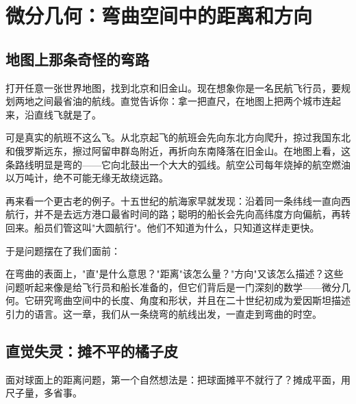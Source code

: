 \chapter{微分几何：弯曲空间中的距离和方向}

\section{地图上那条奇怪的弯路}

打开任意一张世界地图，找到北京和旧金山。现在想象你是一名民航飞行员，要规划两地之间最省油的航线。直觉告诉你：拿一把直尺，在地图上把两个城市连起来，沿直线飞就是了。

可是真实的航班不这么飞。从北京起飞的航班会先向东北方向爬升，掠过我国东北和俄罗斯远东，擦过阿留申群岛附近，再折向东南降落在旧金山。在地图上看，这条路线明显是弯的——它向北鼓出一个大大的弧线。航空公司每年烧掉的航空燃油以万吨计，绝不可能无缘无故绕远路。

再来看一个更古老的例子。十五世纪的航海家早就发现：沿着同一条纬线一直向西航行，并不是去远方港口最省时间的路；聪明的船长会先向高纬度方向偏航，再转回来。船员们管这叫"大圆航行"。他们不知道为什么，只知道这样走更快。

于是问题摆在了我们面前：

\begin{center}
\end{center}

在弯曲的表面上，"直"是什么意思？"距离"该怎么量？"方向"又该怎么描述？这些问题听起来像是给飞行员和船长准备的，但它们背后是一门深刻的数学——微分几何。它研究弯曲空间中的长度、角度和形状，并且在二十世纪初成为爱因斯坦描述引力的语言。这一章，我们从一条绕弯的航线出发，一直走到弯曲的时空。

\section{直觉失灵：摊不平的橘子皮}

面对球面上的距离问题，第一个自然想法是：把球面摊平不就行了？摊成平面，用尺子量，多省事。

